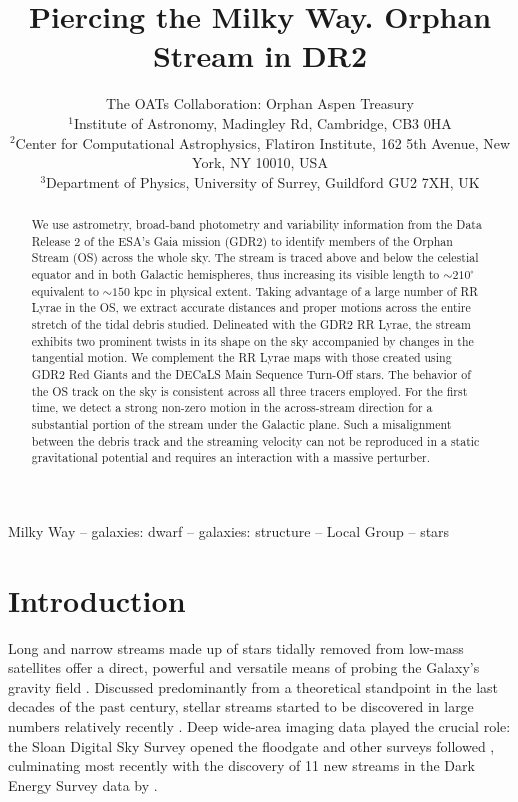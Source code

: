 \documentclass[a4paper,useAMS,usenatbib]{mnras}
\title[Orphan Stream in \gaia DR2]{Piercing the Milky Way. Orphan
  Stream in \gaia DR2}
\author[The OATs Collaboration]{The OATs Collaboration: Orphan Aspen Treasury\\
  $^{1}$Institute of Astronomy, Madingley Rd, Cambridge, CB3 0HA\\
  $^{2}$Center for Computational Astrophysics, Flatiron Institute, 162 5th Avenue, New York, NY 10010, USA\\
  $^{3}$Department of Physics, University of Surrey, Guildford GU2 7XH, UK\\
}
\begin{document}
\maketitle

\label{firstpage}

\begin{abstract}
We use astrometry, broad-band photometry and variability information
from the Data Release 2 of the ESA's Gaia mission (GDR2) to identify
members of the Orphan Stream (OS) across the whole sky. The stream is
traced above and below the celestial equator and in both Galactic
hemispheres, thus increasing its visible length to $\sim210^{\circ}$
equivalent to $\sim150$ kpc in physical extent. Taking advantage of a
large number of RR Lyrae in the OS, we extract accurate distances and
proper motions across the entire stretch of the tidal debris
studied. Delineated with the GDR2 RR Lyrae, the stream exhibits two
prominent twists in its shape on the sky accompanied by changes in the
tangential motion. We complement the RR Lyrae maps with those created
using GDR2 Red Giants and the DECaLS Main Sequence Turn-Off stars. The
behavior of the OS track on the sky is consistent across all three
tracers employed. For the first time, we detect a strong non-zero
motion in the across-stream direction for a substantial portion of the
stream under the Galactic plane. Such a misalignment between the
debris track and the streaming velocity can not be reproduced in a
static gravitational potential and requires an interaction with a
massive perturber.

\end{abstract}

\begin{keywords}
Milky Way -- galaxies: dwarf -- galaxies: structure -- Local Group -- stars
\end{keywords}

\section{Introduction}

Long and narrow streams made up of stars tidally removed from low-mass
satellites offer a direct, powerful and versatile means of probing the
Galaxy's gravity field \citep[see e.g.][]{Donald1982, Kuhn1993,
  Donald1995,Johnston1996,Helmi1999,Johnston1999,Murali1999}. Discussed
predominantly from a theoretical standpoint in the last decades of the
past century, stellar streams started to be discovered in large
numbers relatively recently
\citep[e.g.][]{Ibata2001,Odenkirchen2001,Newberg2002,
  Majewski2003,FOS,Grillmair2006}. Deep wide-area imaging data played
the crucial role: the Sloan Digital Sky Survey \citep[SDSS,
  see][]{Gunn1998,York2000,SDSS_DR8,SDSS_DR12} opened the floodgate
\citep[e.g.][]{OS_C,OS_V,Grillmair2009,Newberg2009,Koposov2012,
  Bonaca2012} and other surveys followed
\citep[e.g.][]{Koposov2014,Bernard2016,Balbinot2016}, culminating most
recently with the discovery of 11 new streams in the Dark Energy
Survey data \citep[DES, see][]{DES2005,DES2016} by \citet{Shipp2018}.
\end{document}
